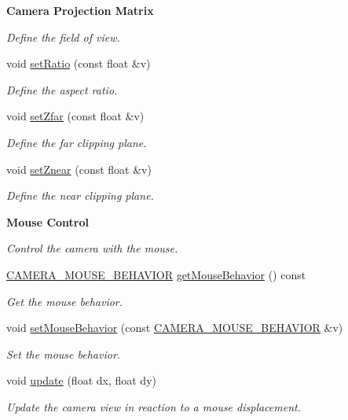 \begin{Indent}{\bf Camera Projection Matrix}
\begin{DoxyCompactItemize}
\begin{DoxyCompactList}\small\item\em Define the field of view. \end{DoxyCompactList}\item 
void \hyperlink{classCamera_aa191430dcb1e9f7ab01251d3081913a6}{set\+Ratio} (const float \&v)
\begin{DoxyCompactList}\small\item\em Define the aspect ratio. \end{DoxyCompactList}\item 
void \hyperlink{classCamera_ad0f1812ed5bf995493591e1c8aff19a3}{set\+Zfar} (const float \&v)
\begin{DoxyCompactList}\small\item\em Define the far clipping plane. \end{DoxyCompactList}\item 
void \hyperlink{classCamera_a86cc28211d99e582cdbeba609c644208}{set\+Znear} (const float \&v)
\begin{DoxyCompactList}\small\item\em Define the near clipping plane. \end{DoxyCompactList}\end{DoxyCompactItemize}
\end{Indent}
\begin{Indent}{\bf Mouse Control}\par
{\em Control the camera with the mouse. }\begin{DoxyCompactItemize}
\item 
\hyperlink{classCamera_a39b92a45686a6f858a3405ee34a95cfa}{C\+A\+M\+E\+R\+A\+\_\+\+M\+O\+U\+S\+E\+\_\+\+B\+E\+H\+A\+V\+I\+O\+R} \hyperlink{classCamera_a35b61591c2a26f707c95e2a17c00ec70}{get\+Mouse\+Behavior} () const 
\begin{DoxyCompactList}\small\item\em Get the mouse behavior. \end{DoxyCompactList}\item 
void \hyperlink{classCamera_ae2b1471c97d7709358ccd754e68c1ca6}{set\+Mouse\+Behavior} (const \hyperlink{classCamera_a39b92a45686a6f858a3405ee34a95cfa}{C\+A\+M\+E\+R\+A\+\_\+\+M\+O\+U\+S\+E\+\_\+\+B\+E\+H\+A\+V\+I\+O\+R} \&v)
\begin{DoxyCompactList}\small\item\em Set the mouse behavior. \end{DoxyCompactList}\item 
void \hyperlink{classCamera_a21e660f7345ef5cfb347ac5c78e0c491}{update} (float dx, float dy)
\begin{DoxyCompactList}\small\item\em Update the camera view in reaction to a mouse displacement. \end{DoxyCompactList}\end{DoxyCompactItemize}
\end{Indent}
